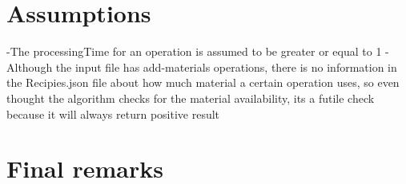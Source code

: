 \documentclass[12pt]{article}
\begin{document}
\section{Assumptions}

-The processingTime for an operation is assumed to be greater or equal to 1
-Although the input file has add-materials operations, there is no information in the Recipies.json file about how much material a certain operation uses, so even thought the algorithm checks for
the material availability, its a futile check because it will always return positive result

\section{Final remarks}
\end{document}
